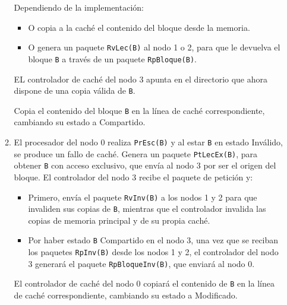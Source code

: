 \begin{ejercicio}
\begin{enumerate}
\begin{enumerate}
            Dependiendo de la implementación:
            \begin{itemize}
                \item O copia a la caché el contenido del bloque desde la memoria.
                \item O genera un paquete \verb|RvLec(B)| al nodo 1 o 2, para que le devuelva el bloque \verb|B| a través de un paquete \verb|RpBloque(B)|.
            \end{itemize}
            EL controlador de caché del nodo 3 apunta en el directorio que ahora dispone de una copia válida de \verb|B|.

            Copia el contenido del bloque \verb|B| en la línea de caché correspondiente, cambiando su estado a Compartido.
        
        \item El procesador del nodo 0 realiza \verb|PrEsc(B)| y al estar \verb|B| en estado Inválido, se produce un fallo de caché. Genera un paquete \verb|PtLecEx(B)|, para obtener \verb|B| con acceso exclusivo, que envía al nodo 3 por ser el origen del bloque. El controlador del nodo 3 recibe el paquete de petición y:
            \begin{itemize}
                \item Primero, envía el paquete \verb|RvInv(B)| a los nodos 1 y 2 para que invaliden sus copias de \verb|B|, mientras que el controlador invalida las copias de memoria principal y de su propia caché.
                \item Por haber estado \verb|B| Compartido en el nodo 3, una vez que se reciban los paquetes \verb|RpInv(B)| desde los nodos 1 y 2, el controlador del nodo 3 generará el paquete \verb|RpBloqueInv(B)|, que enviará al nodo 0.
            \end{itemize}

            El controlador de caché del nodo 0 copiará el contenido de \verb|B| en la línea de caché correspondiente, cambiando su estado a Modificado.
    \end{enumerate}

\end{enumerate}

\end{ejercicio}

